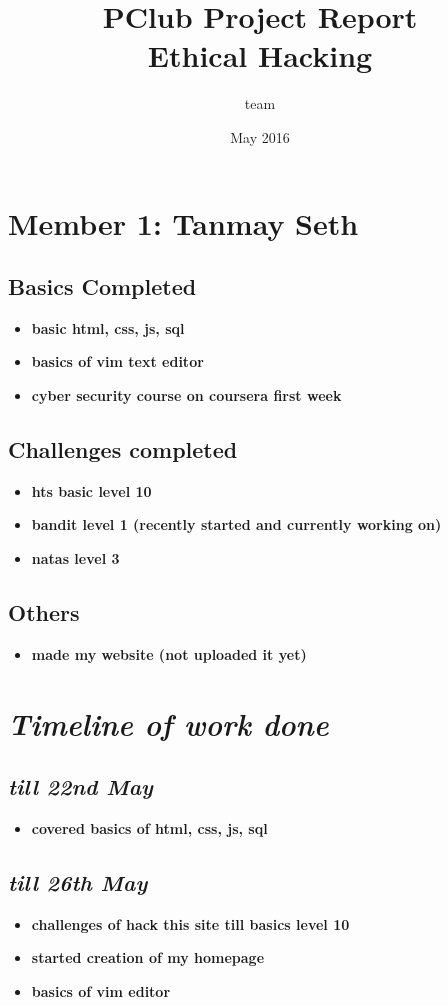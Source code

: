 \documentclass{article}
\title{
    PClub Project Report
\\
Ethical Hacking
}
\author{team}
\date{May 2016}
\begin{document}
\maketitle

\newpage
\section*{Member 1: Tanmay Seth}
\subsection*{Basics Completed}
\begin{itemize}
    \item \textbf{ basic html, css, js, sql}
    \item \textbf{basics of vim text editor}
    \item \textbf{cyber security course on coursera first week}
\end{itemize}
\subsection*{Challenges completed}
\begin{itemize}
    \item \textbf{hts basic level 10}
    \item \textbf{bandit level 1 (recently started and currently working on)}
    \item \textbf{natas level 3}
\end{itemize}
\subsection*{Others}
\begin{itemize}
    \item \textbf{made my website (not uploaded it yet)}
\end{itemize}
\section*{\textit{Timeline of work done}}
\subsection*{\textit{till 22nd May}}
\begin{itemize}
    \item \textbf{covered basics of html, css, js, sql}
\end{itemize}
\subsection*{\textit{till 26th May}}
\begin{itemize}
    \item \textbf{challenges of hack this site till basics level 10}
    \item 
        \textbf{started creation of my homepage}
    \item \textbf{basics of vim editor}
\end{itemize}
\end{document}
